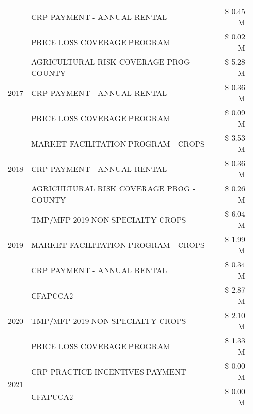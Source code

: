 \begin{tabular}{llr}
 & CRP PAYMENT - ANNUAL RENTAL & \$ 0.45 M \\
 & PRICE LOSS COVERAGE PROGRAM & \$ 0.02 M \\
\cline{1-3}
\multirow[t]{3}{*}{2017} & AGRICULTURAL RISK COVERAGE PROG - COUNTY & \$ 5.28 M \\
 & CRP PAYMENT - ANNUAL RENTAL & \$ 0.36 M \\
 & PRICE LOSS COVERAGE PROGRAM & \$ 0.09 M \\
\cline{1-3}
\multirow[t]{3}{*}{2018} & MARKET FACILITATION PROGRAM - CROPS & \$ 3.53 M \\
 & CRP PAYMENT - ANNUAL RENTAL & \$ 0.36 M \\
 & AGRICULTURAL RISK COVERAGE PROG - COUNTY & \$ 0.26 M \\
\cline{1-3}
\multirow[t]{3}{*}{2019} & TMP/MFP 2019 NON SPECIALTY CROPS & \$ 6.04 M \\
 & MARKET FACILITATION PROGRAM - CROPS & \$ 1.99 M \\
 & CRP PAYMENT - ANNUAL RENTAL & \$ 0.34 M \\
\cline{1-3}
\multirow[t]{3}{*}{2020} & CFAPCCA2 & \$ 2.87 M \\
 & TMP/MFP 2019 NON SPECIALTY CROPS & \$ 2.10 M \\
 & PRICE LOSS COVERAGE PROGRAM & \$ 1.33 M \\
\cline{1-3}
\multirow[t]{2}{*}{2021} & CRP PRACTICE INCENTIVES PAYMENT & \$ 0.00 M \\
 & CFAPCCA2 & \$ 0.00 M \\
\cline{1-3}
\bottomrule
\end{tabular}
